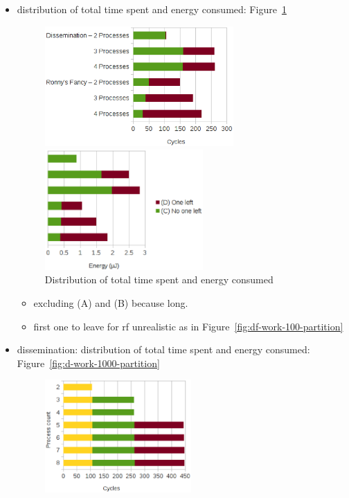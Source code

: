 \documentclass[a4paper, 10pt]{article}
\begin{document}
\begin{itemize}
	\item distribution of total time spent and energy consumed: Figure~\ref{fig:df-work-1000-partition}
		\begin{figure}[htbp]
			\centering
			\begin{minipage}[b]{0.54\linewidth}
				\includegraphics[height=4.6cm]{charts/df-time-work-1000-partition}
			\end{minipage}
			\begin{minipage}[b]{0.42\linewidth}
				\includegraphics[height=4.6cm]{charts/df-energy-work-1000-partition}
			\end{minipage}
			\caption{Distribution of total time spent and energy consumed}
			\label{fig:df-work-1000-partition}
		\end{figure}
		\begin{itemize}
			\item excluding (A) and (B) because long.
			\item first one to leave for rf unrealistic as in Figure~\ref{fig:df-work-100-partition}
		\end{itemize}
	\item dissemination: distribution of total time spent and energy consumed: Figure~\ref{fig:d-work-1000-partition}
		\begin{figure}[htbp]
			\centering
			\begin{minipage}[b]{0.42\linewidth}
				\includegraphics[height=4.3cm]{charts/d-time-work-1000-partition}

\end{minipage}
\end{figure}
\end{itemize}
\end{document}
